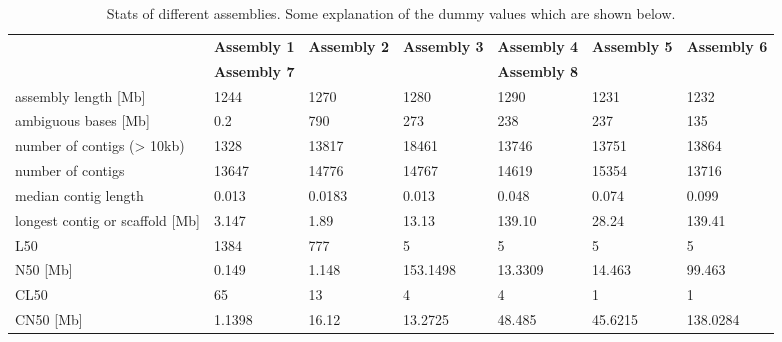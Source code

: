 \begin{landscape}
\begin{table}						
\caption{Stats of different assemblies. Some explanation of the dummy values which are shown below.}
\centering
\begin{tabular}{@{}lllllll@{}}\toprule						
\toprule						
 & 	\textbf{Assembly 1} & 	\textbf{Assembly 2} & 	\textbf{Assembly 3} & 	\textbf{Assembly 4} & 	\textbf{Assembly 5} & 	\textbf{Assembly 6} \\
 & 	\textbf{Assembly 7} & 	 & 	 & 	\textbf{Assembly 8} & 	 & 	 \\
\hline						
assembly length [Mb] & 	1244 & 	1270 & 	1280 & 	1290 & 	1231 & 	1232 \\
ambiguous bases [Mb] & 	0.2 & 	790 & 	273 & 	238 & 	237 & 	135 \\
number of contigs (> 10kb) & 	1328 & 	13817 & 	18461 & 	13746 & 	13751 & 	13864 \\
number of contigs & 	13647 & 	14776 & 	14767 & 	14619 & 	15354 & 	13716 \\
median contig length & 	0.013 & 	0.0183 & 	0.013 & 	0.048 & 	0.074 & 	0.099 \\
longest contig or scaffold [Mb] & 	3.147 & 	1.89 & 	13.13 & 	139.10 & 	28.24 & 	139.41 \\
L50 & 	1384 & 	777 & 	5 & 	5 & 	5 & 	5 \\
N50 [Mb] & 	0.149 & 	1.148 & 	153.1498 & 	13.3309 & 	14.463 & 	99.463 \\
CL50 & 	65 & 	13 & 	4 & 	4 & 	1 & 	1 \\
CN50 [Mb] & 	1.1398 & 	16.12 & 	13.2725 & 	48.485 & 	45.6215 & 	138.0284 \\
\bottomrule						
\end{tabular}						
\label{table:assemblystats}						
\end{table}
\end{landscape}
